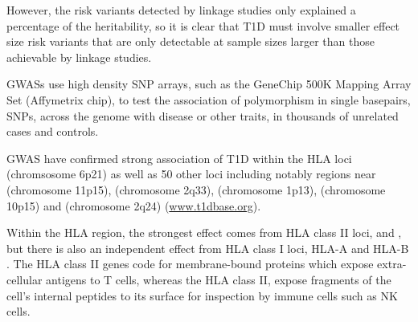 


However, the risk variants detected by linkage studies only explained a percentage of the heritability,
so it is clear that T1D must involve smaller effect size risk variants that are only detectable at sample sizes larger than those achievable by linkage studies.


\Glspl{GWAS} use high density \gls{SNP} arrays, such as the GeneChip 500K Mapping Array Set (Affymetrix chip),
to test the association of polymorphism in single basepairs, \glspl{SNP}, across the genome with disease or other traits,
in thousands of unrelated cases and controls.


\Gls{GWAS} have confirmed strong association of T1D within the \Gls{HLA} loci (chromsosome 6p21) as well as 50 other loci including notably regions near
 (chromosome 11p15),  (chromosome 2q33),  (chromosome 1p13),  (chromosome 10p15)
and  (chromosome 2q24) \citep{Burton:2007hta,Barrett:2009jq}
(\url{www.t1dbase.org}).

Within the HLA region, the strongest effect comes from HLA class II loci,  and ,
but there is also an independent effect from HLA class I loci, HLA-A and HLA-B \citep{Howson:2009bl}.
The HLA class II genes code for membrane-bound proteins which expose extra-cellular antigens to T cells,
whereas the HLA class II, expose fragments of the cell's internal peptides to its surface for inspection by immune cells such as \gls{NK} cells.


